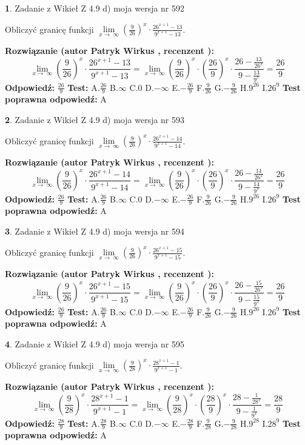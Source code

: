 \documentclass[12pt, a4paper]{article}
\theoremstyle{definition} %
\newtheorem{zad}{}
\newcommand{\zadStart}[1]{\begin{zad}#1\newline}
\newcommand{\zadStop}{\end{zad}}
\newcommand{\rozwStart}[2]{\noindent \textbf{Rozwiązanie (autor #1 , recenzent #2): }\newline}
\newcommand{\rozwStop}{\newline}
\newcommand{\odpStart}{\noindent \textbf{Odpowiedź:}\newline}
\newcommand{\odpStop}{\newline}
\newcommand{\testStart}{\noindent \textbf{Test:}\newline}
\newcommand{\testStop}{\newline}
\newcommand{\kluczStart}{\noindent \textbf{Test poprawna odpowiedź:}\newline}
\newcommand{\kluczStop}{\newline}
\begin{document}
\zadStart{Zadanie z Wikieł Z 4.9 d) moja wersja nr 592}


Obliczyć granicę funkcji  $\lim\limits_{x\to\ \infty}(\frac{9}{26})^{x}\cdot\frac{26^{x+1}-13}{9^{x+1}-13}$.
\zadStop
\rozwStart{Patryk Wirkus}{}
$$\lim\limits_{x\to\ \infty}(\frac{9}{26})^{x}\cdot\frac{26^{x+1}-13}{9^{x+1}-13}=\lim\limits_{x\to\ \infty}(\frac{9}{26})^{x}\cdot(\frac{26}{9})^{x} \cdot \frac{26-\frac{13}{26^{x}}}{9-\frac{13}{9^{x}}} = \frac{26}{9}$$
\rozwStop
\odpStart
$\frac{26}{9}$
\odpStop
\testStart
A.$\frac{26}{9}$ B.$\infty$ C.$0$ D.$-\infty$ E.$-\frac{26}{9}$
F.$\frac{9}{26}$ G.$-\frac{9}{26}$
H.$9^{26}$
I.$26^{9}$
\testStop
\kluczStart
A
\kluczStop



\zadStart{Zadanie z Wikieł Z 4.9 d) moja wersja nr 593}


Obliczyć granicę funkcji  $\lim\limits_{x\to\ \infty}(\frac{9}{26})^{x}\cdot\frac{26^{x+1}-14}{9^{x+1}-14}$.
\zadStop
\rozwStart{Patryk Wirkus}{}
$$\lim\limits_{x\to\ \infty}(\frac{9}{26})^{x}\cdot\frac{26^{x+1}-14}{9^{x+1}-14}=\lim\limits_{x\to\ \infty}(\frac{9}{26})^{x}\cdot(\frac{26}{9})^{x} \cdot \frac{26-\frac{14}{26^{x}}}{9-\frac{14}{9^{x}}} = \frac{26}{9}$$
\rozwStop
\odpStart
$\frac{26}{9}$
\odpStop
\testStart
A.$\frac{26}{9}$ B.$\infty$ C.$0$ D.$-\infty$ E.$-\frac{26}{9}$
F.$\frac{9}{26}$ G.$-\frac{9}{26}$
H.$9^{26}$
I.$26^{9}$
\testStop
\kluczStart
A
\kluczStop



\zadStart{Zadanie z Wikieł Z 4.9 d) moja wersja nr 594}


Obliczyć granicę funkcji  $\lim\limits_{x\to\ \infty}(\frac{9}{26})^{x}\cdot\frac{26^{x+1}-15}{9^{x+1}-15}$.
\zadStop
\rozwStart{Patryk Wirkus}{}
$$\lim\limits_{x\to\ \infty}(\frac{9}{26})^{x}\cdot\frac{26^{x+1}-15}{9^{x+1}-15}=\lim\limits_{x\to\ \infty}(\frac{9}{26})^{x}\cdot(\frac{26}{9})^{x} \cdot \frac{26-\frac{15}{26^{x}}}{9-\frac{15}{9^{x}}} = \frac{26}{9}$$
\rozwStop
\odpStart
$\frac{26}{9}$
\odpStop
\testStart
A.$\frac{26}{9}$ B.$\infty$ C.$0$ D.$-\infty$ E.$-\frac{26}{9}$
F.$\frac{9}{26}$ G.$-\frac{9}{26}$
H.$9^{26}$
I.$26^{9}$
\testStop
\kluczStart
A
\kluczStop



\zadStart{Zadanie z Wikieł Z 4.9 d) moja wersja nr 595}


Obliczyć granicę funkcji  $\lim\limits_{x\to\ \infty}(\frac{9}{28})^{x}\cdot\frac{28^{x+1}-1}{9^{x+1}-1}$.
\zadStop
\rozwStart{Patryk Wirkus}{}
$$\lim\limits_{x\to\ \infty}(\frac{9}{28})^{x}\cdot\frac{28^{x+1}-1}{9^{x+1}-1}=\lim\limits_{x\to\ \infty}(\frac{9}{28})^{x}\cdot(\frac{28}{9})^{x} \cdot \frac{28-\frac{1}{28^{x}}}{9-\frac{1}{9^{x}}} = \frac{28}{9}$$
\rozwStop
\odpStart
$\frac{28}{9}$
\odpStop
\testStart
A.$\frac{28}{9}$ B.$\infty$ C.$0$ D.$-\infty$ E.$-\frac{28}{9}$
F.$\frac{9}{28}$ G.$-\frac{9}{28}$
H.$9^{28}$
I.$28^{9}$
\testStop
\kluczStart
A
\kluczStop
\end{document}
